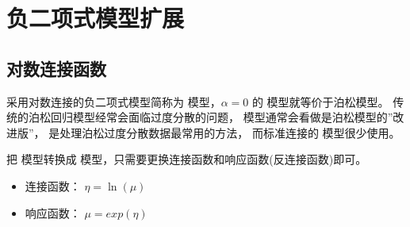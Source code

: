\documentclass[letterpaper,10pt,english]{sphinxmanual}
\begin{document}
\section{负二项式模型扩展}
\label{\detokenize{_u8d1f_u4e8c_u9879_u6a21_u578b/content:id8}}

\subsection{对数连接函数}
\label{\detokenize{_u8d1f_u4e8c_u9879_u6a21_u578b/content:id9}}
采用对数连接的负二项式模型简称为  模型，\(\alpha=0\) 的
 模型就等价于泊松模型。
传统的泊松回归模型经常会面临过度分散的问题，
 模型通常会看做是泊松模型的”改进版”，
是处理泊松过度分散数据最常用的方法，
而标准连接的  模型很少使用。

把  模型转换成  模型，只需要更换连接函数和响应函数(反连接函数)即可。
\begin{itemize}
\item {} 
连接函数： \(\eta=\ln(\mu)\)

\item {} 
响应函数： \(\mu=exp(\eta)\)

\end{itemize}
\end{document}
